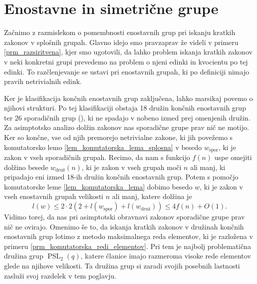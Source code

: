 \section{Enostavne in simetrične grupe}



Začnimo z razmislekom o pomembnosti enostavnih grup pri iskanju kratkih zakonov v splošnih grupah. Glavno idejo smo pravzaprav že videli v primeru \ref{prm_razsiritvena}, kjer smo ugotovili, da
lahko problem iskanja kratkih zakonov v neki konkretni grupi prevedemo na problem o njeni edinki in kvocientu po tej edinki. To razčlenjevanje se ustavi pri enostavnih grupah, ki po definiciji nimajo pravih netrivialnih edink.

Ker je klasifikacija končnih enostavnih grup zaključena, lahko marsikaj povemo o njihovi strukturi. Po tej klasifikaciji obstaja 18 družin končnih enostavnih grup ter 26 sporadičnih grup (\cite[str.~249]{Bresar_2019}), ki ne spadajo v nobeno izmed prej omenjenih družin.
Za asimptotsko analizo dolžin zakonov nas sporadične grupe prav nič ne motijo. Ker so končne, vse od njih premorejo netrivialne zakone, ki jih povežemo s komutatorsko lemo \ref{lem_komutatorska_lema_splosna} v besedo $w_{\text{spor}}$,
ki je zakon v vseh sporadičnih grupah. Recimo, da nam s funkcijo $f(n)$ uspe omejiti dolžino besede $w_{\text{druž}}(n)$, ki je zakon v vseh grupah moči $n$ ali manj, ki pripadajo eni izmed 18-ih družin končnih enostavnih grup.
Potem s pomočjo komutatorske leme \ref{lem_komutatorska_lema} dobimo besedo $w$, ki je zakon v vseh enostavnih grupah velikosti $n$ ali manj, katere dolžina je 
\begin{equation*}
    l(w) \le 2 \cdot 2 (2 + l(w_{\text{spor}}) + l(w_{\text{druž}}) )  \le 4f(n) + O(1).
\end{equation*}
Vidimo torej, da nas pri asimptotski obravnavi zakonov sporadične grupe prav nič ne ovirajo. Omenimo še to, da iskanja kratkih zakonov v družinah končnih enostavnih grup
lotimo z metodo maksimalnega reda elementov, ki je razložena v primeru \ref{prm_komutatorska_redi_elementov}. Pri tem je najbolj problematična družina grup $\operatorname{PSL}_2(q)$,
katere članice imajo razmeroma visoke rede elementov glede na njihove velikosti. Ta družina grup si zaradi svojih posebnih lastnosti zasluži svoj razdelek v tem poglavju.

